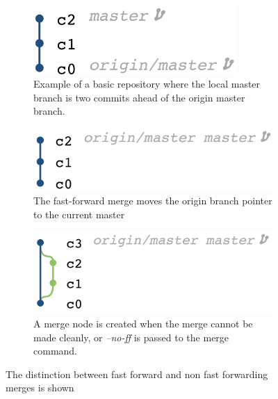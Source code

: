 \begin{figure}[htpb]
  \centering
  \begin{subfigure}[b]{0.5\textwidth}
    \includegraphics[width=0.85\textwidth]{Figures/background/repos/base_repo.png}
    \caption{Example of a basic repository where the local master branch
      is two commits ahead of the origin master branch.}
  \end{subfigure}

  \begin{subfigure}[b]{0.5\textwidth}
    \includegraphics[width=\textwidth]{Figures/background/repos/fast_forward.png}
    \caption{The fast-forward merge moves the origin branch pointer to
      the current master}
    \label{fig:fast_forwarded_merge}
  \end{subfigure}

  \begin{subfigure}[b]{0.5\textwidth}
    \includegraphics[width=\textwidth]{Figures/background/repos/merge_commit.png}
    \caption{A merge node is created when the merge cannot be made
      cleanly, or \textit{--no-ff} is passed to the merge command.}
    \label{fig:merge_node_merge}
  \end{subfigure}
  \caption{The distinction between fast forward and non fast forwarding
  merges is shown}
  \label{fig:merge_styles}
\end{figure}

